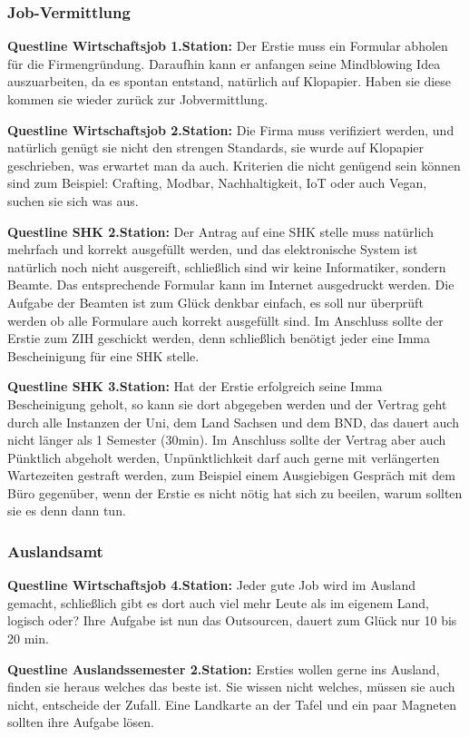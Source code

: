\subsubsection{Job-Vermittlung}
\textbf{Questline Wirtschaftsjob 1.Station:} Der Erstie muss ein Formular abholen für die Firmengründung. Daraufhin kann er anfangen seine Mindblowing Idea auszuarbeiten, da es spontan entstand, natürlich auf Klopapier. Haben sie diese kommen sie wieder zurück zur Jobvermittlung.

\textbf{Questline Wirtschaftsjob 2.Station:} Die Firma muss verifiziert werden, und natürlich genügt sie nicht den strengen Standards, sie wurde auf Klopapier geschrieben, was erwartet man da auch. Kriterien die nicht genügend sein können sind zum Beispiel: Crafting, Modbar, Nachhaltigkeit, IoT oder auch Vegan, suchen sie sich was aus.

\textbf{Questline SHK 2.Station:} Der Antrag auf eine SHK stelle muss natürlich mehrfach und korrekt ausgefüllt werden, und das elektronische System ist natürlich noch nicht ausgereift, schließlich sind wir keine Informatiker, sondern Beamte. Das entsprechende Formular kann im Internet ausgedruckt werden. Die Aufgabe der Beamten ist zum Glück denkbar einfach, es soll nur überprüft werden ob alle Formulare auch korrekt ausgefüllt sind. Im Anschluss sollte der Erstie zum ZIH geschickt werden, denn schließlich benötigt jeder eine Imma Bescheinigung für eine SHK stelle.

\textbf{Questline SHK 3.Station:} Hat der Erstie erfolgreich seine Imma Bescheinigung geholt, so kann sie dort abgegeben werden und der Vertrag geht durch alle Instanzen der Uni, dem Land Sachsen und dem BND, das dauert auch nicht länger als 1 Semester (30min). Im Anschluss sollte der Vertrag aber auch Pünktlich abgeholt werden, Unpünktlichkeit darf auch gerne mit verlängerten Wartezeiten gestraft werden, zum Beispiel einem Ausgiebigen Gespräch mit dem Büro gegenüber, wenn der Erstie es nicht nötig hat sich zu beeilen, warum sollten sie es denn dann tun.

\subsubsection{Auslandsamt}
\textbf{Questline Wirtschaftsjob 4.Station:} Jeder gute Job wird im Ausland gemacht, schließlich gibt es dort auch viel mehr Leute als im eigenem Land, logisch oder? Ihre Aufgabe ist nun das Outsourcen, dauert zum Glück nur 10 bis 20 min.

\textbf{Questline Auslandssemester 2.Station:} Ersties wollen gerne ins Ausland, finden sie heraus welches das beste ist. Sie wissen nicht welches, müssen sie auch nicht, entscheide der Zufall. Eine Landkarte an der Tafel und ein paar Magneten sollten ihre Aufgabe lösen.


